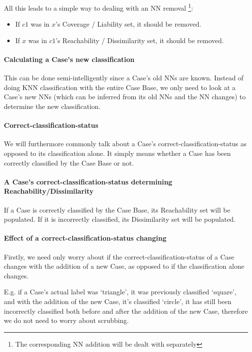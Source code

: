 \documentclass[a4paper,11pt]{report}
\begin{document}
All this leads to a simple way to dealing with an NN removal \footnote{The corresponding NN addition will be dealt with separately}:
\begin{itemize}
	\item If $c1$ was in $x$'s Coverage / Liability set, it should be removed.
	\item If $x$ was in $c1$'s Reachability / Dissimilarity set, it should be removed.
\end{itemize}

\paragraph{Calculating a Case's new classification}
This can be done semi-intelligently since a Case's old NNs are known. Instead of doing KNN classification with the entire Case Base, we only need to look at a Case's new NNs (which can be inferred from its old NNs and the NN changes) to determine the new classification.

\paragraph{Correct-classification-status}
We will furthermore commonly talk about a Case's correct-classification-status as opposed to its classification alone. It simply means whether a Case has been correctly classified by the Case Base or not. 

\paragraph{A Case's correct-classification-status determining Reachability/Dissimilarity}
If a Case is correctly classified by the Case Base, its Reachability set will be populated. If it is incorrectly classified, its Dissimilarity set will be populated.
 
\paragraph{Effect of a correct-classification-status changing}
Firstly, we need only worry about if the correct-classification-status of a Case changes with the addition of a new Case, as opposed to if the classification alone changes.

E.g. if a Case's actual label was `triangle', it was previously classified `square', and with the addition of the new Case, it's classified `circle', it has still been incorrectly classified both before and after the addition of the new Case, therefore we do not need to worry about scrubbing.
\end{document}
